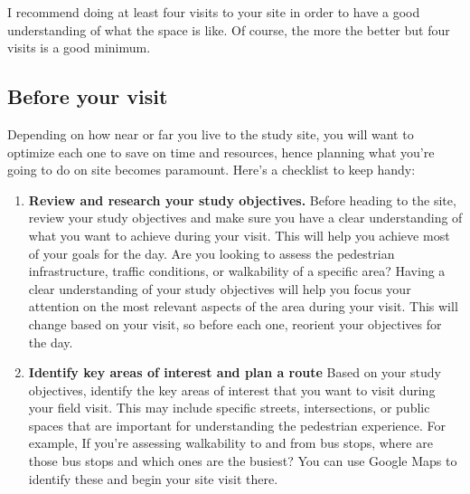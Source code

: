 \documentclass[
]{latex/krantz}
\begin{document}
I recommend doing at least four visits to your site in order to have a good understanding of what the space is like. Of course, the more the better but four visits is a good minimum.

\hypertarget{before}{%
\subsection{Before your visit}\label{before}}

Depending on how near or far you live to the study site, you will want to optimize each one to save on time and resources, hence planning what you're going to do on site becomes paramount. Here's a checklist to keep handy:

\begin{enumerate}
\def\labelenumi{\arabic{enumi}.}
\item
  \textbf{Review and research your study objectives.} Before heading to the site, review your study objectives and make sure you have a clear understanding of what you want to achieve during your visit. This will help you achieve most of your goals for the day. Are you looking to assess the pedestrian infrastructure, traffic conditions, or walkability of a specific area? Having a clear understanding of your study objectives will help you focus your attention on the most relevant aspects of the area during your visit. This will change based on your visit, so before each one, reorient your objectives for the day.
\item
  \textbf{Identify key areas of interest and plan a route} Based on your study objectives, identify the key areas of interest that you want to visit during your field visit. This may include specific streets, intersections, or public spaces that are important for understanding the pedestrian experience. For example, If you're assessing walkability to and from bus stops, where are those bus stops and which ones are the busiest? You can use Google Maps to identify these and begin your site visit there.


\end{enumerate}
\end{document}
